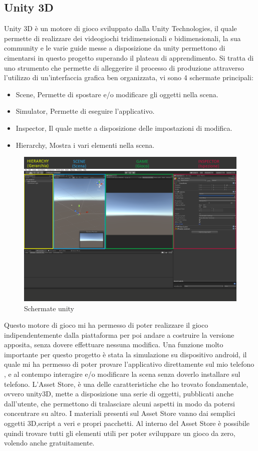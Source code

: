 \documentclass[
a4paper,
cleardoublepage=empty,
headings=twolinechapter,
numbers=autoenddot,
]{scrbook}
\begin{document}
	\subsection{Unity 3D}\label{unity3D}
	Unity 3D è un motore di gioco sviluppato dalla Unity
	Technologies, il quale permette di realizzare dei videogiochi tridimensionali e bidimensionali, la sua community e le varie guide messe a disposizione da unity permettono di cimentarsi in questo progetto superando il plateau di apprendimento.
	Si tratta di uno strumento che permette di alleggerire il processo di produzione attraverso l'utilizzo di un'interfaccia grafica ben organizzata, vi sono 4 schermate principali:
	\begin{itemize}
		\item Scene, Permette di spostare e/o modificare gli oggetti nella scena.
		\item Simulator, Permette di eseguire l'applicativo.
		\item Inspector, Il quale mette a disposizione delle impostazioni di modifica.
		\item Hierarchy, Mostra i vari elementi nella scena.
	\end{itemize}
	\begin{figure}[H]
		\centering
		\includegraphics[width=0.8\linewidth]{image/unity}
		\caption{Schermate unity}
		\label{fig:unity}
	\end{figure}
	Questo motore di gioco mi ha permesso  di poter realizzare il gioco indipendentemente dalla piattaforma per poi andare a costruire la versione apposita, senza dovere effettuare nessuna modifica.
	Una funzione molto importante per questo progetto è stata la simulazione su dispositivo android, il quale mi ha permesso di poter provare l'applicativo direttamente sul mio telefono , e al contempo interagire e/o modificare la scena senza doverlo installare sul telefono.
    L'Asset Store, è una delle caratteristiche che ho trovato fondamentale, ovvero unity3D, mette a disposizione una serie di oggetti, pubblicati anche dall'utente, che permettono di tralasciare alcuni aspetti in modo da potersi concentrare su altro.
	I materiali presenti sul Asset Store vanno dai semplici oggetti 3D,script a veri e propri pacchetti.
	Al interno del Asset Store è possibile quindi trovare tutti gli elementi utili per poter sviluppare un gioco da zero, volendo anche gratuitamente.
\end{document}
